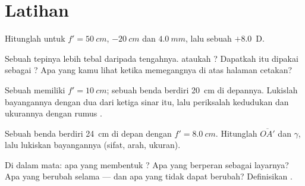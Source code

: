 \section{Latihan}

\begin{exercise}[$\star$]\label{exo:g11:lenses-and-eye:1}
Hitunglah  untuk $f' = \qty{50}{cm}$, $\qty{-20}{cm}$ dan
$\qty{4.0}{mm}$, lalu  sebuah  $+8.0$~D.
\end{exercise}

\begin{exercise}[$\star$]\label{exo:g11:lenses-and-eye:2}
Sebuah  tepinya lebih tebal daripada tengahnya.  ataukah
? Dapatkah  itu dipakai sebagai ? Apa yang kamu lihat
ketika memegangnya di atas halaman cetakan?
\end{exercise}

\begin{exercise}[$\star$]\label{exo:g11:lenses-and-eye:3}
Sebuah  memiliki $f' = \qty{10}{cm}$; sebuah benda berdiri
\qty{20}{cm} di depannya. Lukislah bayangannya dengan dua dari ketiga
sinar itu, lalu periksalah kedudukan dan ukurannya dengan rumus
.
\end{exercise}

\begin{exercise}[$\star$]\label{exo:g11:lenses-and-eye:4}
Sebuah benda berdiri \qty{24}{cm} di depan  dengan
$f' = \qty{8.0}{cm}$. Hitunglah $\overline{OA'}$ dan $\gamma$, lalu
lukiskan bayangannya (sifat, arah, ukuran).
\end{exercise}

\begin{exercise}[$\star$]\label{exo:g11:lenses-and-eye:5}
Di dalam mata: apa yang membentuk ? Apa yang berperan
sebagai layarnya? Apa yang berubah selama  --- dan apa yang
tidak dapat berubah? Definisikan  .
\end{exercise}


